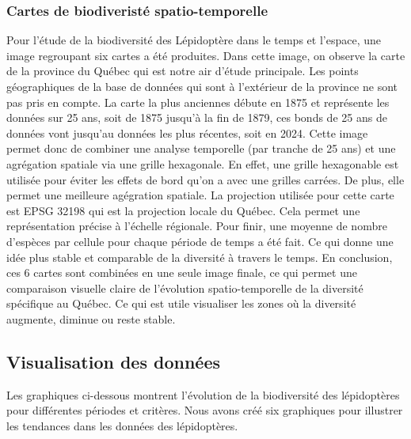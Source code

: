 \documentclass[9pt,twocolumn,twoside,]{pnas-new}
\begin{document}
\subsubsection{Cartes de biodiveristé
spatio-temporelle}\label{cartes-de-biodiveristuxe9-spatio-temporelle}

Pour l'étude de la biodiversité des Lépidoptère dans le temps et
l'espace, une image regroupant six cartes a été produites. Dans cette
image, on observe la carte de la province du Québec qui est notre air
d'étude principale. Les points géographiques de la base de données qui
sont à l'extérieur de la province ne sont pas pris en compte. La carte
la plus anciennes débute en 1875 et représente les données sur 25 ans,
soit de 1875 jusqu'à la fin de 1879, ces bonds de 25 ans de données vont
jusqu'au données les plus récentes, soit en 2024. Cette image permet
donc de combiner une analyse temporelle (par tranche de 25 ans) et une
agrégation spatiale via une grille hexagonale. En effet, une grille
hexagonable est utilisée pour éviter les effets de bord qu'on a avec une
grilles carrées. De plus, elle permet une meilleure agégration spatiale.
La projection utilisée pour cette carte est EPSG 32198 qui est la
projection locale du Québec. Cela permet une représentation précise à
l'échelle régionale. Pour finir, une moyenne de nombre d'espèces par
cellule pour chaque période de temps a été fait. Ce qui donne une idée
plus stable et comparable de la diversité à travers le temps. En
conclusion, ces 6 cartes sont combinées en une seule image finale, ce
qui permet une comparaison visuelle claire de l'évolution
spatio-temporelle de la diversité spécifique au Québec. Ce qui est utile
visualiser les zones où la diversité augmente, diminue ou reste stable.

\subsection{Visualisation des
données}\label{visualisation-des-donnuxe9es}

Les graphiques ci-dessous montrent l'évolution de la biodiversité des
lépidoptères pour différentes périodes et critères. Nous avons créé six
graphiques pour illustrer les tendances dans les données des
lépidoptères.
\end{document}
